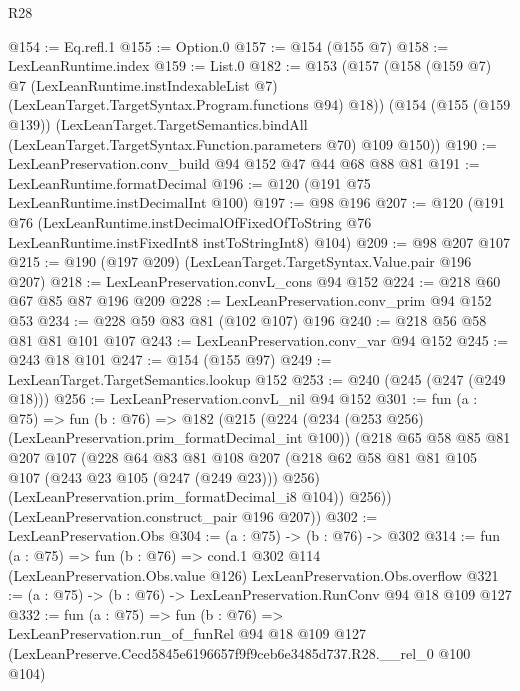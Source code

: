 \begin{lexlean}{R28}
\begin{coremodule}
@154 := Eq.refl.{1}
@155 := Option.{0}
@157 := @154 (@155 @7)
@158 := LexLeanRuntime.index
@159 := List.{0}
@182 := @153
    (@157
      (@158
        (@159 @7)
        @7
        (LexLeanRuntime.instIndexableList @7)
        (LexLeanTarget.TargetSyntax.Program.functions @94)
        @18))
    (@154
      (@155 (@159 @139))
      (LexLeanTarget.TargetSemantics.bindAll
        (LexLeanTarget.TargetSyntax.Function.parameters @70)
        @109
        @150))
@190 := LexLeanPreservation.conv_build @94 @152 @47 @44 @68 @88 @81
@191 := LexLeanRuntime.formatDecimal
@196 := @120 (@191 @75 LexLeanRuntime.instDecimalInt @100)
@197 := @98 @196
@207 := @120
    (@191
      @76
      (LexLeanRuntime.instDecimalOfFixedOfToString
        @76
        LexLeanRuntime.instFixedInt8
        instToStringInt8)
      @104)
@209 := @98 @207 @107
@215 := @190 (@197 @209) (LexLeanTarget.TargetSyntax.Value.pair @196 @207)
@218 := LexLeanPreservation.convL_cons @94 @152
@224 := @218 @60 @67 @85 @87 @196 @209
@228 := LexLeanPreservation.conv_prim @94 @152 @53
@234 := @228 @59 @83 @81 (@102 @107) @196
@240 := @218 @56 @58 @81 @81 @101 @107
@243 := LexLeanPreservation.conv_var @94 @152
@245 := @243 @18 @101
@247 := @154 (@155 @97)
@249 := LexLeanTarget.TargetSemantics.lookup @152
@253 := @240 (@245 (@247 (@249 @18)))
@256 := LexLeanPreservation.convL_nil @94 @152
@301 := fun (a : @75) =>
  fun (b : @76) =>
  @182
    (@215
      (@224
        (@234 (@253 @256) (LexLeanPreservation.prim_formatDecimal_int @100))
        (@218
          @65
          @58
          @85
          @81
          @207
          @107
          (@228
            @64
            @83
            @81
            @108
            @207
            (@218 @62 @58 @81 @81 @105 @107 (@243 @23 @105 (@247 (@249 @23))) @256)
            (LexLeanPreservation.prim_formatDecimal_i8 @104))
          @256))
      (LexLeanPreservation.construct_pair @196 @207))
@302 := LexLeanPreservation.Obs
@304 := (a : @75) -> (b : @76) -> @302
@314 := fun (a : @75) =>
  fun (b : @76) =>
  cond.{1} @302 @114 (LexLeanPreservation.Obs.value @126) LexLeanPreservation.Obs.overflow
@321 := (a : @75) -> (b : @76) -> LexLeanPreservation.RunConv @94 @18 @109 @127
@332 := fun (a : @75) =>
  fun (b : @76) =>
  LexLeanPreservation.run_of_funRel
    @94
    @18
    @109
    @127
    (LexLeanPreserve.Cecd5845e6196657f9f9ceb6e3485d737.R28.__rel_0 @100 @104)
\end{coremodule}
\end{lexlean}
